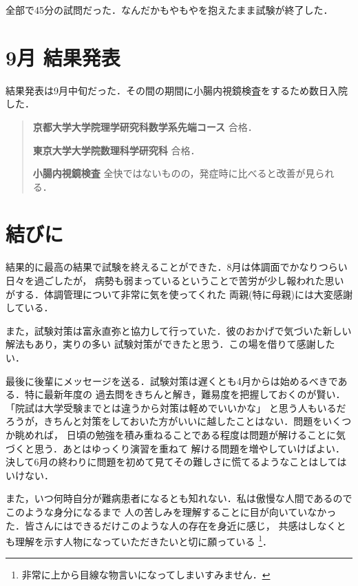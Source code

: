 \documentclass[dvipdfmx,uplatex]{jsarticle}
\begin{document}
全部で45分の試問だった．なんだかもやもやを抱えたまま試験が終了した．

\section{9月 結果発表}
結果発表は9月中旬だった．その間の期間に小腸内視鏡検査をするため数日入院した．
\begin{quote}
  \textbf{京都大学大学院理学研究科数学系先端コース} 合格．

  \textbf{東京大学大学院数理科学研究科} 合格．

  \textbf{小腸内視鏡検査} 全快ではないものの，発症時に比べると改善が見られる．
\end{quote}

\section{結びに}
結果的に最高の結果で試験を終えることができた．8月は体調面でかなりつらい日々を過ごしたが，
病勢も弱まっているということで苦労が少し報われた思いがする．体調管理について非常に気を使ってくれた
両親(特に母親)には大変感謝している．

また，試験対策は富永直弥と協力して行っていた．彼のおかげで気づいた新しい解法もあり，実りの多い
試験対策ができたと思う．この場を借りて感謝したい．

最後に後輩にメッセージを送る．試験対策は遅くとも4月からは始めるべきである．特に最新年度の
過去問をきちんと解き，難易度を把握しておくのが賢い．「院試は大学受験までとは違うから対策は軽めでいいかな」
と思う人もいるだろうが，きちんと対策をしておいた方がいいに越したことはない．問題をいくつか眺めれば，
日頃の勉強を積み重ねることである程度は問題が解けることに気づくと思う．あとはゆっくり演習を重ねて
解ける問題を増やしていけばよい．決して6月の終わりに問題を初めて見てその難しさに慌てるようなことはしては
いけない．

また，いつ何時自分が難病患者になるとも知れない．私は傲慢な人間であるのでこのような身分になるまで
人の苦しみを理解することに目が向いていなかった．皆さんにはできるだけこのような人の存在を身近に感じ，
共感はしなくとも理解を示す人物になっていただきたいと切に願っている
\footnote{非常に上から目線な物言いになってしまいすみません．}．
\end{document}
